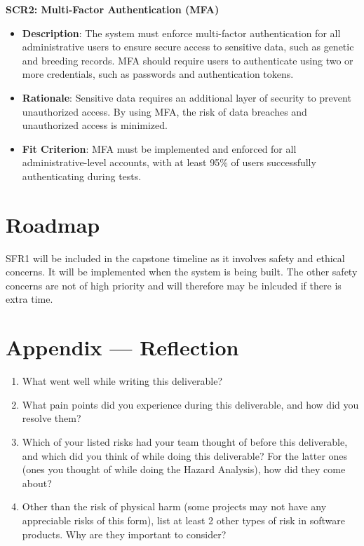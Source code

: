 \documentclass{article}
\begin{document}
\textbf{SCR2: Multi-Factor Authentication (MFA)} 
\begin{itemize}
    \item \textbf{Description}: The system must enforce multi-factor 
    authentication for all administrative users to ensure secure access to 
    sensitive data, such as genetic and breeding records. MFA should require 
    users to authenticate using two or more credentials, such as passwords and 
    authentication tokens.
    \item \textbf{Rationale}: Sensitive data requires an additional layer of 
    security to prevent unauthorized access. By using MFA, the risk of data 
    breaches and unauthorized access is minimized.
    \item \textbf{Fit Criterion}: MFA must be implemented and enforced for all 
    administrative-level accounts, with at least 95\% of users successfully 
    authenticating during tests.
\end{itemize}

\section{Roadmap}

SFR1 will be included in the capstone timeline as it involves safety and 
ethical concerns. It will be implemented when the system is being built. The 
other safety concerns are not of high priority and will therefore may be 
inlcuded if there is extra time.

\newpage{}

\section*{Appendix --- Reflection}




\begin{enumerate}
    \item What went well while writing this deliverable? 
    \item What pain points did you experience during this deliverable, and how
    did you resolve them?
    \item Which of your listed risks had your team thought of before this
    deliverable, and which did you think of while doing this deliverable? For
    the latter ones (ones you thought of while doing the Hazard Analysis), how
    did they come about?
    \item Other than the risk of physical harm (some projects may not have any
    appreciable risks of this form), list at least 2 other types of risk in
    software products. Why are they important to consider?
\end{enumerate}
\end{document}
